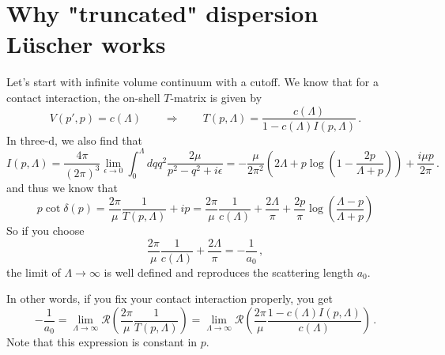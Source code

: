 \documentclass[aps,superscriptaddress,tightenlines,nofootinbib,floatfix,longbibliography,notitlepage]{revtex4-1}
\begin{document}
\section{Why "truncated" dispersion Lüscher works}

Let's start with infinite volume continuum with a cutoff.
We know that for a contact interaction, the on-shell $T$-matrix is given by
\begin{equation}
	V(p', p) = c(\Lambda) \qquad \Rightarrow \qquad
	T(p, \Lambda) = \frac{c(\Lambda)}{1 - c(\Lambda) I(p, \Lambda)} \, .
\end{equation}
In three-d, we also find that
\begin{equation}
	I(p, \Lambda)
	=
	\frac{4 \pi}{(2\pi)^3} \lim_{\epsilon \to 0}\int_{0}^{\Lambda} d q q^2 \frac{2 \mu}{p^2 - q^2 + i \epsilon}
	=
	-\frac{\mu}{2\pi^2}   \left(2 \Lambda +p \log \left(1-\frac{2 p}{\Lambda +p}\right)\right) + \frac{i \mu p}{2 \pi}
	\, .
\end{equation}
and thus we know that
\begin{equation}
	p \cot \delta(p) 
	= \frac{2 \pi}{\mu}\frac{1}{T(p, \Lambda)} + i p
	= \frac{2 \pi}{\mu} \frac{1}{c(\Lambda)} + \frac{2 \Lambda}{\pi} + \frac{2 p}{\pi} \log \left( \frac{\Lambda - p}{\Lambda + p}\right)
\end{equation}
So if you choose
\begin{equation}
	\frac{2 \pi}{\mu} \frac{1}{c(\Lambda)} + \frac{2 \Lambda}{\pi} = - \frac{1}{a_0} \, ,
\end{equation}
the limit of $\Lambda \to \infty$ is well defined and reproduces the scattering length $a_0$.

In other words, if you fix your contact interaction properly, you get
\begin{equation}
	- \frac{1}{a_0}
	=
	\lim\limits_{\Lambda \to \infty} \mathcal R \left( \frac{2 \pi}{\mu} \frac{1}{T(p, \Lambda)} \right)
	=
	\lim\limits_{\Lambda \to \infty} \mathcal R \left(\frac{2 \pi}{\mu}   \frac{1 - c(\Lambda) I(p, \Lambda)}{c(\Lambda)} \right)
	\, .
\end{equation}
Note that this expression is constant in $p$.
\end{document}
